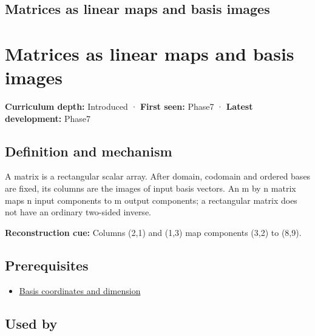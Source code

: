 \hypertarget{appendix-bd39c3bf5d64}{}
\section*{Matrices as linear maps and basis images}
\chapter{Matrices as linear maps and basis images}\label{appendix-bd39c3bf5d64-matrices-as-linear-maps-and-basis-images}

\textbf{Curriculum depth:} Introduced · \textbf{First seen:} Phase7 · \textbf{Latest development:} Phase7

\section{Definition and mechanism}\label{appendix-bd39c3bf5d64-definition-and-mechanism}

A matrix is a rectangular scalar array. After domain, codomain and ordered bases are fixed, its columns are the images of input basis vectors. An m by n matrix maps n input components to m output components; a rectangular matrix does not have an ordinary two-sided inverse.

\textbf{Reconstruction cue:} Columns (2,1) and (1,3) map components (3,2) to (8,9).

\section{Prerequisites}\label{appendix-bd39c3bf5d64-prerequisites}

\begin{itemize}
\tightlist
\item
  \hyperref[appendix-ce0341f7ea0d]{Basis coordinates and dimension}
\end{itemize}

\section{Used by}\label{appendix-bd39c3bf5d64-used-by}

